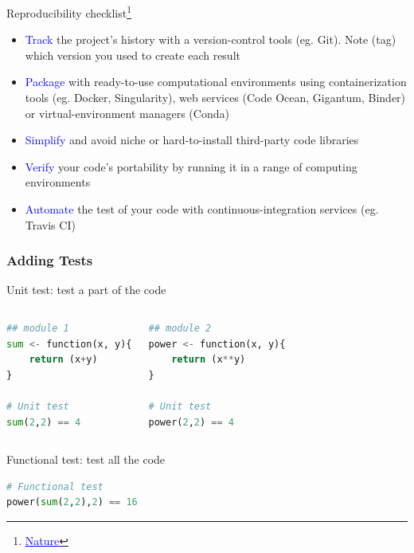 \begin{frame}{Reproducibility checklist\footnote{\href{https://www.nature.com/articles/d41586-020-02462-7}{\textcolor{blue}{\underline{Nature}}}}}

\begin{itemize}
    \item \textcolor{blue}{Track} the project’s history with a version-control tools (eg. Git). Note (tag) which version you used to create each result
    \item \textcolor{blue}{Package} with ready-to-use computational environments using containerization tools (eg. Docker, Singularity), web services (Code Ocean, Gigantum, Binder) or virtual-environment managers (Conda)
    \item \textcolor{blue}{Simplify} and avoid niche or hard-to-install third-party code libraries
    \item \textcolor{blue}{Verify} your code’s portability by running it in a range of computing environments
    \item \textcolor{blue}{Automate} the test of your code with continuous-integration services (eg. Travis CI)
\end{itemize}
\end{frame}    
\begin{frame}[containsverbatim]
\frametitle{Adding Tests}
\begin{block}{Unit test: test a part of the code}
\begin{columns}
\begin{lstlisting}[language=python]
## module 1
sum <- function(x, y){
    return (x+y)
}

# Unit test
sum(2,2) == 4
\end{lstlisting}
\begin{lstlisting}[language=python]
## module 2
power <- function(x, y){
    return (x**y)
}

# Unit test
power(2,2) == 4
\end{lstlisting}
\end{columns}
\end{block}
\begin{block}{Functional test: test all the code}
\begin{lstlisting}[language=python]
# Functional test
power(sum(2,2),2) == 16
\end{lstlisting}
\end{block}
\end{frame}

